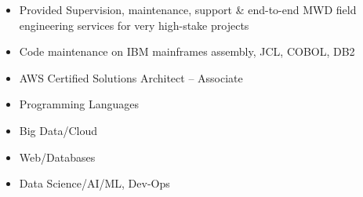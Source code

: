 \documentclass[10pt,a4paper,ragged2e,withhyper]{altacv}
\begin{document}
\begin{paracol}{2}
\divider

\begin{itemize}
\item Provided Supervision, maintenance, support \& end-to-end MWD field engineering services for very high-stake projects
\end{itemize}

\divider

\begin{itemize}
\item Code maintenance on IBM mainframes assembly, JCL, COBOL, DB2 
\end{itemize}

\newpage

\switchcolumn

\begin{itemize}
\item AWS Certified Solutions Architect – Associate    
\end{itemize}



\begin{itemize}
\item \textcolor{emphasis}{Programming Languages} 
\end{itemize}


\begin{itemize}
\item \textcolor{emphasis}{Big Data/Cloud} 
\end{itemize}

\begin{itemize}
\item \textcolor{emphasis}{Web/Databases} 
\end{itemize}

\begin{itemize}
\item \textcolor{emphasis}{Data Science/AI/ML, Dev-Ops} 
\end{itemize}


\end{paracol}
\end{document}
